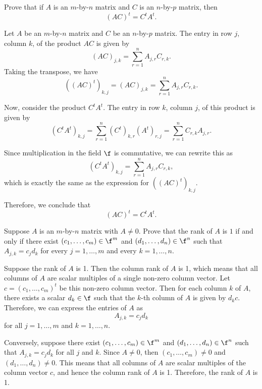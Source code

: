 \begin{exercise}[3c15]
    Prove that if $A$ is an $m$-by-$n$ matrix and $C$ is an $n$-by-$p$ matrix, then
    \[(AC)^t = C^t A^t.\]
\end{exercise}

\begin{sol}
    Let $A$ be an $m$-by-$n$ matrix and $C$ be an $n$-by-$p$ matrix. The entry in row $j$, column $k$, of the product $AC$ is given by
    \[(AC)_{j, k} = \sum_{r = 1}^{n} A_{j, r} C_{r, k}.\]
    Taking the transpose, we have
    \[((AC)^t)_{k, j} = (AC)_{j, k} = \sum_{r = 1}^{n} A_{j, r} C_{r, k}.\]

    Now, consider the product $C^t A^t$. The entry in row $k$, column $j$, of this product is given by
    \[(C^t A^t)_{k, j} = \sum_{r = 1}^{n} (C^t)_{k, r} (A^t)_{r, j} = \sum_{r = 1}^{n} C_{r, k} A_{j, r}.\]

    Since multiplication in the field $\f$ is commutative, we can rewrite this as
    \[(C^t A^t)_{k, j} = \sum_{r = 1}^{n} A_{j, r} C_{r, k},\]
    which is exactly the same as the expression for $((AC)^t)_{k, j}$.

    Therefore, we conclude that
    \[(AC)^t = C^t A^t.\]
\end{sol}

\begin{exercise}[3c16]
    Suppose $A$ is an $m$-by-$n$ matrix with $A \neq 0$. Prove that the rank of $A$ is $1$ if and only if there exist $(c_1, \ldots, c_m) \in \f^m$ and $(d_1, \ldots, d_n) \in \f^n$ such that $A_{j, k} = c_j d_k$ for every $j = 1, \ldots, m$ and every $k = 1, \ldots, n$.
\end{exercise}

\begin{sol}
    Suppose the rank of $A$ is 1. Then the column rank of $A$ is 1, which means that all columns of $A$ are scalar multiples of a single non-zero column vector. Let $c = (c_1, \ldots, c_m)^t$ be this non-zero column vector. Then for each column $k$ of $A$, there exists a scalar $d_k \in \f$ such that the $k$-th column of $A$ is given by $d_k c$. Therefore, we can express the entries of $A$ as
    \[A_{j, k} = c_j d_k\]
    for all $j = 1, \ldots, m$ and $k = 1, \ldots, n$.

    Conversely, suppose there exist $(c_1, \ldots, c_m) \in \f^m$ and $(d_1, \ldots, d_n) \in \f^n$ such that $A_{j, k} = c_j d_k$ for all $j$ and $k$. Since $A \neq 0$, then $(c_1, \ldots, c_m) \neq 0$ and $(d_1, \ldots, d_n) \neq 0$. This means that all columns of $A$ are scalar multiples of the column vector $c$, and hence the column rank of $A$ is 1. Therefore, the rank of $A$ is 1.
\end{sol}


